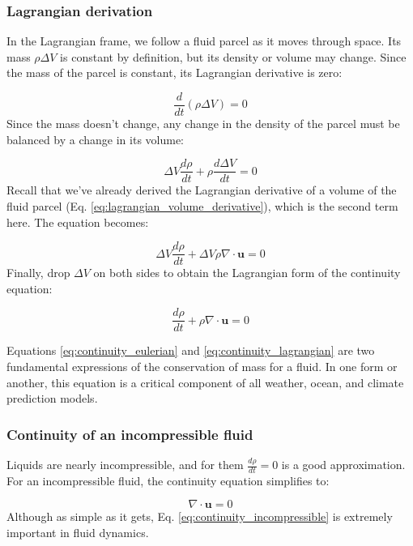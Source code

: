 \documentclass[12pt]{article}
\numberwithin{equation}{section}
\numberwithin{figure}{section}
\numberwithin{table}{section}
\begin{document}
\subsubsection{Lagrangian derivation}

In the Lagrangian frame, we follow a fluid parcel as it moves through space.
Its mass $\rho \Delta V$ is constant by definition, but its density or volume
may change.
Since the mass of the parcel is constant, its Lagrangian derivative is zero:

\begin{equation}
  \frac{d}{dt} (\rho \Delta V) = 0
\end{equation}
Since the mass doesn't change, any change in the density of the parcel must be
balanced by a change in its volume:

\begin{equation}
  \Delta V \frac{d\rho}{dt} + \rho \frac{d\Delta V}{dt} = 0
\end{equation}
Recall that we've already derived the Lagrangian derivative of a volume of the
fluid parcel (Eq. \ref{eq:lagrangian_volume_derivative}), which is the second
term here.
The equation becomes:

\begin{equation}
  \Delta V \frac{d\rho}{dt} + \Delta V \rho \nabla \cdot \mathbf{u} = 0
\end{equation}
Finally, drop $\Delta V$ on both sides to obtain the Lagrangian form of the
continuity equation:

\begin{equation}
  \frac{d\rho}{dt} + \rho \nabla \cdot \mathbf{u} = 0
  \label{eq:continuity_lagrangian}
\end{equation}

Equations \ref{eq:continuity_eulerian} and \ref{eq:continuity_lagrangian} are
two fundamental expressions of the conservation of mass for a fluid.
In one form or another, this equation is a critical component of all weather,
ocean, and climate prediction models.

\subsubsection{Continuity of an incompressible fluid}

Liquids are nearly incompressible, and for them $\frac{d\rho}{dt} = 0$ is a good
approximation.
For an incompressible fluid, the continuity equation simplifies to:

\begin{equation}
  \nabla \cdot \mathbf{u} = 0
  \label{eq:continuity_incompressible}
\end{equation}
Although as simple as it gets, Eq. \ref{eq:continuity_incompressible} is
extremely important in fluid dynamics.
\end{document}
